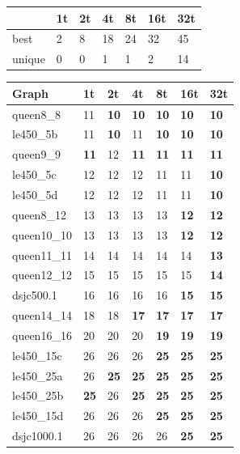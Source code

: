 \documentclass[12pt,a4paper,twoside]{scrartcl}
\numberwithin{equation}{section}
\begin{document}
\begin{table}[h!]
    \begin{tabular}{| l |l| l | l|l|l|p{1cm}|}
\hline
&1t&2t&4t&8t&16t&32t\\ \hline
best& 2&8&18&24&32&45\\ \hline
unique&0&0&1&1&2&14\\ \hline
    \end{tabular}
\end{table}
\clearpage
\begin{table}
\begin{center}
    \begin{tabular}{| l | l | l|l|l|l|p{1cm}|}
\hline
Graph&1t&2t&4t&8t&16t&32t\\ \hline
queen8\_8&11&\textbf{10}&\textbf{10}&\textbf{10}&\textbf{10}&\textbf{10}\\ 
le450\_5b&11&\textbf{10}&11&\textbf{10}&\textbf{10}&\textbf{10}\\
queen9\_9&\textbf{11}&12&\textbf{11}&\textbf{11}&\textbf{11}&\textbf{11}\\
le450\_5c&12&12&12&11&11&\textbf{10}\\
le450\_5d&12&12&12&11&11&\textbf{10}\\ \hline
queen8\_12&13&13&13&13&\textbf{12}&\textbf{12}\\
queen10\_10&13&13&13&13&\textbf{12}&\textbf{12}\\ 
queen11\_11&14&14&14&14&14&\textbf{13}\\
queen12\_12&15&15&15&15&15&\textbf{14}\\
dsjc500.1&16&16&16&16&\textbf{15}&\textbf{15}\\ \hline
queen14\_14&18&18&\textbf{17}&\textbf{17}&\textbf{17}&\textbf{17}\\
queen16\_16&20&20&20&\textbf{19}&\textbf{19}&\textbf{19}\\
le450\_15c&26&26&26&\textbf{25}&\textbf{25}&\textbf{25}\\ 
le450\_25a&26&\textbf{25}&\textbf{25}&\textbf{25}&\textbf{25}&\textbf{25}\\
le450\_25b&\textbf{25}&26&\textbf{25}&\textbf{25}&\textbf{25}&\textbf{25}\\ \hline
le450\_15d&26&26&26&\textbf{25}&\textbf{25}&\textbf{25}\\ 
dsjc1000.1&26&26&26&26&\textbf{25}&\textbf{25}\\

\end{tabular}
\end{center}
\end{table}
\end{document}
